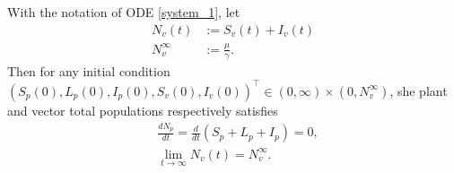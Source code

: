 %
\begin{theorem}\label{theorem_1}
	With the notation of ODE \eqref{system_1}, let
	\begin{equation*}
		\begin{aligned}
			N_v(t) &:= S_v(t) + I_v(t) 
		 	\\
		 	N_v^{\infty} &:= \frac{\mu}{\gamma}.
		 \end{aligned}
	\end{equation*}
	Then for any initial condition 
	$
		(S_p(0), L_p(0), I_p(0), S_v(0), I_v(0) )^\top
	 	\in {(0,\infty) \times (0, N^\infty_v)}
	$, she plant and vector total populations respectively satisfies
	\begin{equation*}
		\begin{aligned}
			& \frac{d N_p}{dt} =
				\frac{d}{dt}(S_p + L_p + I_p) = 0,
			\\
			& \lim_{t\to \infty}
				N_v(t) = N_v^{\infty}.
		\end{aligned}
	\end{equation*}
\end{theorem}
